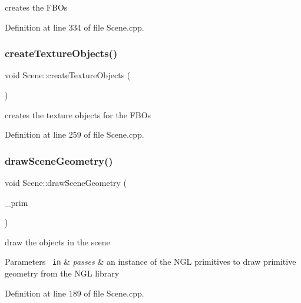creates the F\+B\+Os 



Definition at line 334 of file Scene.\+cpp.

\mbox{\label{class_scene_afbd8f3791139915e8a3e966459ce22c9}} 
\subsubsection{createTextureObjects()}
{\footnotesize\ttfamily void Scene\+::create\+Texture\+Objects (\begin{DoxyParamCaption}{ }\end{DoxyParamCaption})\hspace{0.3cm}{\ttfamily [private]}}



creates the texture objects for the F\+B\+Os 



Definition at line 259 of file Scene.\+cpp.

\mbox{\label{class_scene_a42339c24522a2e9f1822e3b67627200c}} 
\subsubsection{drawSceneGeometry()}
{\footnotesize\ttfamily void Scene\+::draw\+Scene\+Geometry (\begin{DoxyParamCaption}\item[{ngl\+::\+V\+A\+O\+Primitives $\ast$}]{\+\_\+prim }\end{DoxyParamCaption})\hspace{0.3cm}{\ttfamily [private]}}



draw the objects in the scene 


\begin{DoxyParams}[1]{Parameters}
\mbox{\texttt{ in}}  & {\em passes} & an instance of the N\+GL primitives to draw primitive geometry from the N\+GL library \\
\hline
\end{DoxyParams}


Definition at line 189 of file Scene.\+cpp.

\mbox{\label{class_scene_a98bfe8f456d957f352cd835d25c172fc}} 
